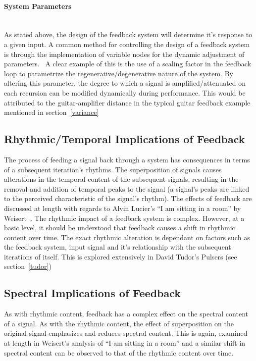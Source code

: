 \documentclass[titlepage]{scrartcl}
\begin{document}
    \paragraph{System Parameters}\mbox{}\\
    As stated above, the design of the feedback system will determine it's
    response to a given input. A common method for controlling the design of a
    feedback system is through the implementation of variable nodes for the
    dynamic adjustment of parameters.~\parencite[p.19-27]{weisert2010ioi}
    A clear example of this is the use of a scaling factor in the feedback loop
    to parametrize the regenerative/degenerative nature of the system. By
    altering this parameter, the degree to which a signal is
    amplified/attenuated on each recursion can be modified dynamically during
    performance. This would be attributed to the guitar-amplifier distance in
    the typical guitar feedback example mentioned in section~\ref{variance}

    \subsection{Rhythmic/Temporal Implications of Feedback}
    The process of feeding a signal back through a system has consequences in
    terms of a subsequent iteration's rhythms. The superposition of signals
    causes alterations in the temporal content of the subsequent signals,
    resulting in the removal and addition of temporal peaks to the signal (a
    signal's peaks are linked to the perceived characteristic of the signal's
    rhythm).  The effects of feedback are discussed at length with regards to
    Alvin Lucier's ``I am sitting in a room'' by 
    Weisert~\parencite[p.64-68]{weisert2010ioi}. The rhythmic impact of a
    feedback system is complex. However, at a basic level, it should be
    understood that feedback causes a shift in rhythmic content over time.  The
    exact rhythmic alteration is dependant on factors such as the feedback
    system, input signal and it's relationship with the subsequent iterations
    of itself. This is explored extensively in David Tudor's Pulsers (see
    section~\ref{tudor})

    \subsection{Spectral Implications of Feedback}
    As with rhythmic content, feedback has a complex effect on the spectral
    content of a signal. As with the rhythmic content, the effect of
    superposition on the original signal emphasizes and reduces spectral
    content. This is again, examined at length in Weisert's analysis of ``I am
    sitting in a room'' and a similar shift in spectral content can be observed
    to that of the rhythmic content over
    time.~\parencite[p.60-64]{weisert2010ioi}
    
\end{document}
